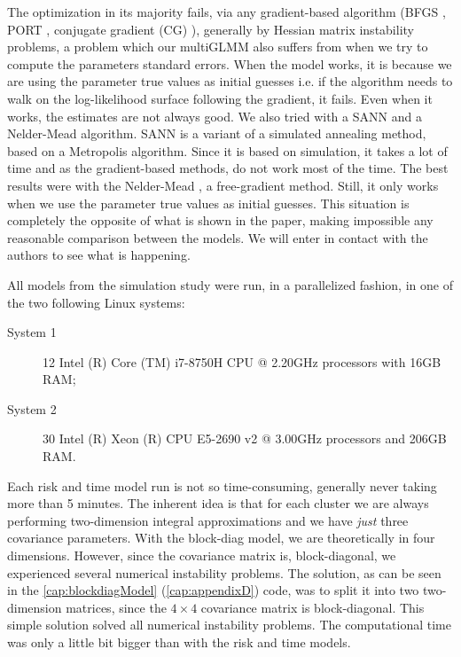 The optimization in its majority fails, via any gradient-based algorithm
(BFGS \cite{nocedal&wright}, PORT \cite{PORTreport, PORTpaper},
conjugate gradient (CG) \cite{CG}), generally by Hessian matrix
instability problems, a problem which our multiGLMM also suffers from
when we try to compute the parameters standard errors. When the model
works, it is because we are using the parameter true values as initial
guesses i.e. if the algorithm needs to walk on the log-likelihood
surface following the gradient, it fails. Even when it works, the
estimates are not always good. We also tried with a SANN and a
Nelder-Mead algorithm. SANN \cite{SANN} is a variant of a simulated
annealing method, based on a Metropolis algorithm. Since it is based on
simulation, it takes a lot of time and as the gradient-based methods, do
not work most of the time. The best results were with the Nelder-Mead
\cite{neldermead}, a free-gradient method. Still, it only works when we
use the parameter true values as initial guesses. This situation is
completely the opposite of what is shown in the paper, making impossible
any reasonable comparison between the models. We will enter in contact
with the authors to see what is happening.

All models from the simulation study were run, in a parallelized
fashion, in one of the two following Linux systems:
\begin{description}
 \item[System 1]
  12 Intel (R) Core (TM) i7-8750H CPU @ 2.20GHz processors
  with 16GB RAM;
 \item[System 2]
  30 Intel (R) Xeon (R) CPU E5-2690 v2 @ 3.00GHz processors
  and 206GB RAM.
\end{description}

Each risk and time model run is not so time-consuming, generally never
taking more than 5 minutes. The inherent idea is that for each cluster
we are always performing two-dimension integral approximations and we
have \textit{just} three covariance parameters. With the block-diag
model, we are theoretically in four dimensions. However, since the
covariance matrix is, block-diagonal, we experienced several numerical
instability problems. The solution, as can be seen in the
\autoref{cap:blockdiagModel} (\autoref{cap:appendixD}) code, was to
split it into two two-dimension matrices, since the \(4\times4\)
covariance matrix is block-diagonal.  This simple solution solved all
numerical instability problems. The computational time was only a little
bit bigger than with the risk and time models.

